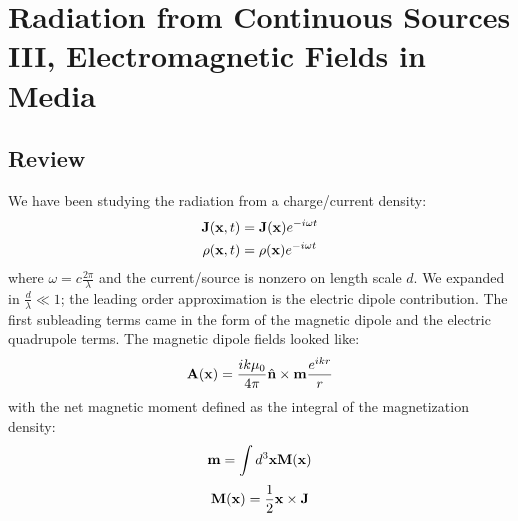 \section{Radiation from Continuous Sources III, Electromagnetic Fields in Media}

\subsection{Review}
We have been studying the radiation from a charge/current density:
\begin{equation}
    \begin{split}
        \mathbf{J}(\mathbf{x}, t) &= \mathbf{J}(\mathbf{x})e^{-i\omega t}
        \\ \rho(\mathbf{x}, t) &= \rho(\mathbf{x})e^{-i\omega t}
    \end{split}
\end{equation}
where $\omega = c\frac{2\pi}{\lambda}$ and the current/source is nonzero on length scale $d$. We expanded in $\frac{d}{\lambda} \ll 1$; the leading order approximation is the electric dipole contribution. The first subleading terms came in the form of the magnetic dipole and the electric quadrupole terms. The magnetic dipole fields looked like:
\begin{equation}
    \mathbf{A}(\mathbf{x}) = \frac{ik\mu_0}{4\pi}\hat{\mathbf{n}}\times\mathbf{m}\frac{e^{ikr}}{r}
\end{equation}
with the net magnetic moment defined as the integral of the magnetization density:
\begin{equation}
    \mathbf{m} = \int d^3\mathbf{x}\mathbf{M}(\mathbf{x})
\end{equation}
\begin{equation}
    \mathbf{M}(\mathbf{x}) = \frac{1}{2}\mathbf{x} \times \mathbf{J}
\end{equation}

